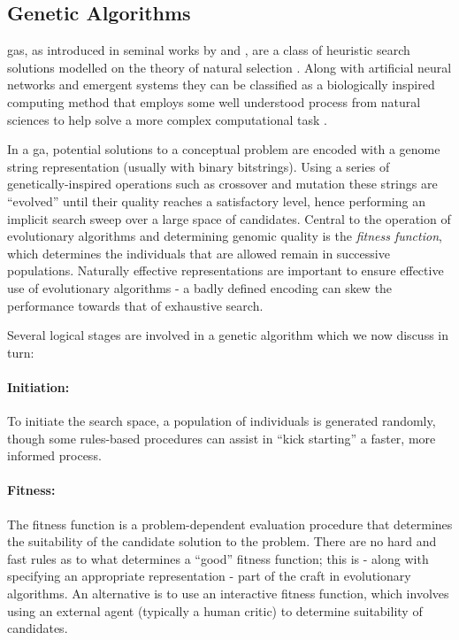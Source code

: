 \subsection{Genetic Algorithms}


\acrfull{ga}s, as introduced in seminal works by \cite{Holland1975} and \cite{Goldberg1989}, are a class of heuristic search solutions modelled on the theory of natural selection \citep{koza1992genetic, Srinivas1994}. Along with artificial neural networks and emergent systems they can be classified as a biologically inspired computing method that employs some well understood  process from natural sciences to help solve a more complex computational task \citep{Mitchell1998}.

In a \acrshort{ga}, potential solutions to a conceptual problem are encoded with a genome string representation (usually with binary bitstrings). Using a series of genetically-inspired operations such as crossover and mutation these strings are ``evolved'' until their quality reaches a satisfactory level, hence performing an implicit search sweep over a large space of candidates.  Central to the operation of evolutionary algorithms and determining genomic quality is the \textit{fitness function}, which determines the individuals that are allowed remain in successive populations. Naturally effective representations are important to ensure effective use of evolutionary algorithms - a badly defined encoding can skew the performance towards that of exhaustive search. 

Several logical stages are involved in a genetic algorithm which we now discuss in turn:

\paragraph{Initiation:}
To initiate the search space, a population of individuals is generated randomly, though some rules-based procedures can assist in “kick starting” a faster, more informed process.

\paragraph{Fitness:}
The fitness function is a problem-dependent evaluation procedure that determines the suitability of the candidate solution to the problem. There are no hard and fast rules as to what determines a “good” fitness function; this is - along with specifying an appropriate representation - part of the craft in evolutionary algorithms. An alternative is to use an interactive fitness function, which involves using an external agent (typically a human critic) to determine suitability of candidates. 

